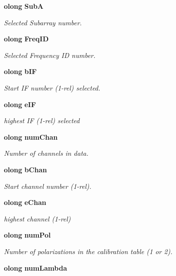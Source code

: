 \begin{CompactItemize}
{\bf olong} {\bf Sub\-A}
\begin{CompactList}\small\item\em Selected Subarray number. \item\end{CompactList}\item 
{\bf olong} {\bf Freq\-ID}
\begin{CompactList}\small\item\em Selected Frequency ID number. \item\end{CompactList}\item 
{\bf olong} {\bf b\-IF}
\begin{CompactList}\small\item\em Start IF number (1-rel) selected. \item\end{CompactList}\item 
{\bf olong} {\bf e\-IF}
\begin{CompactList}\small\item\em highest IF (1-rel) selected \item\end{CompactList}\item 
{\bf olong} {\bf num\-Chan}
\begin{CompactList}\small\item\em Number of channels in data. \item\end{CompactList}\item 
{\bf olong} {\bf b\-Chan}
\begin{CompactList}\small\item\em Start channel number (1-rel). \item\end{CompactList}\item 
{\bf olong} {\bf e\-Chan}
\begin{CompactList}\small\item\em highest channel (1-rel) \item\end{CompactList}\item 
{\bf olong} {\bf num\-Pol}
\begin{CompactList}\small\item\em Number of polarizations in the calibration table (1 or 2). \item\end{CompactList}\item 
{\bf olong} {\bf num\-Lambda}

\end{CompactItemize}
